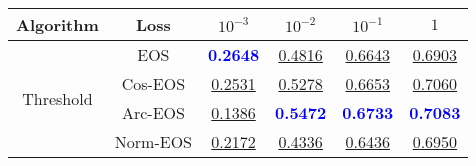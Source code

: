 \begin{table}[t]
\centering
\begin{tabularx}{.7\textwidth}{c|c|cccc}
\bf Algorithm & \bf Loss & $10^{-3}$ & $10^{-2}$ & $10^{-1}$ & $1$\\\hline\hline
\multirow{4}{*}{Threshold} & EOS & \textcolor{blue}{\bf 0.2648} & \underline{0.4816} & \underline{0.6643} & \underline{0.6903}\\
 & Cos-EOS & \underline{0.2531} & \underline{0.5278} & \underline{0.6653} & \underline{0.7060}\\
 & Arc-EOS & \underline{0.1386} & \textcolor{blue}{\bf 0.5472} & \textcolor{blue}{\bf 0.6733} & \textcolor{blue}{\bf 0.7083}\\
 & Norm-EOS & \underline{0.2172} & \underline{0.4336} & \underline{0.6436} & \underline{0.6950}\\
\hline
\end{tabularx}
\end{table}